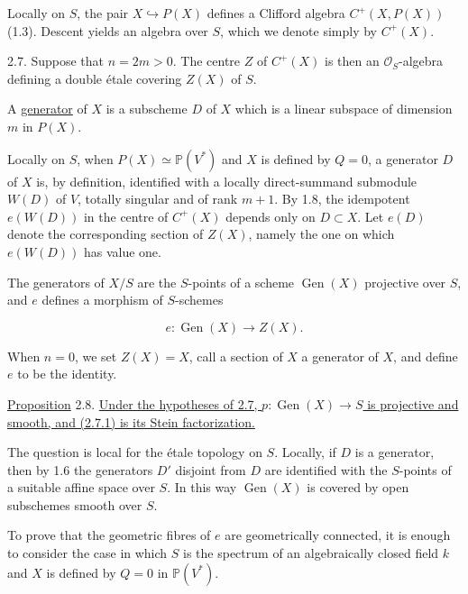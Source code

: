 Locally on $S$, the pair $X\hookrightarrow P(X)$ defines a Clifford
algebra $C^+(X,P(X))$ (1.3).  Descent yields an algebra over $S$, which
we denote simply by $C^+(X)$.

2.7. Suppose that $n=2m>0$.  The centre $Z$ of $C^+(X)$ is then an
$\mathcal O_S$-algebra defining a double \'{e}tale covering $Z(X)$ of
$S$.

A \underline{generator} of $X$ is a subscheme $D$ of $X$ which is a
linear subspace of dimension $m$ in $P(X)$.

Locally on $S$, when $P(X)\simeq\mathbb P(V^*)$ and $X$ is defined by
$Q=0$, a generator $D$ of $X$ is, by definition, identified with a
locally direct-summand submodule $W(D)$ of $V$, totally singular and of
rank $m+1$.  By 1.8, the idempotent $e(W(D))$ in the centre of $C^+(X)$
depends only on $D\subset X$.  Let $e(D)$ denote the corresponding
section of $Z(X)$, namely the one on which $e(W(D))$ has value one.

The generators of $X/S$ are the $S$-points of a scheme
$\operatorname{Gen}(X)$ projective over $S$, and $e$ defines a morphism
of $S$-schemes

\begin{equation}\tag{2.7.1}
e:\operatorname{Gen}(X)\longrightarrow Z(X).
\end{equation}

When $n=0$, we set $Z(X)=X$, call a section of $X$ a generator of $X$,
and define $e$ to be the identity.


\underline{Proposition} 2.8. \underline{Under the hypotheses of 2.7,
$p:\operatorname{Gen}(X)\longrightarrow S$ is projective and smooth,
and (2.7.1) is its Stein factorization.}

The question is local for the \'{e}tale topology on $S$.  Locally, if
$D$ is a generator, then by 1.6 the generators $D'$ disjoint from $D$
are identified with the $S$-points of a suitable affine space over $S$.
In this way $\operatorname{Gen}(X)$ is covered by open subschemes smooth
over $S$.

To prove that the geometric fibres of $e$ are geometrically connected,
it is enough to consider the case in which $S$ is the spectrum of an
algebraically closed field $k$ and $X$ is defined by $Q=0$ in
$\mathbb P(V^*)$.

